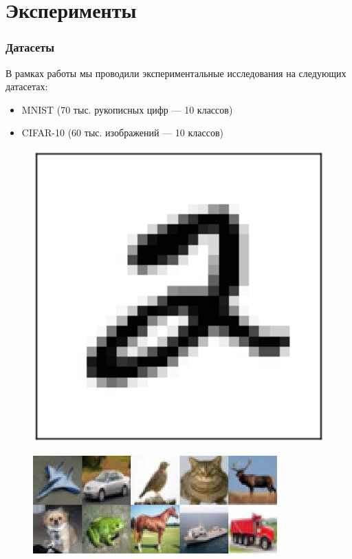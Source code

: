 \documentclass{beamer}
\begin{document}
\section{Эксперименты}

\begin{frame} 
\frametitle{Датасеты}	
В рамках работы мы проводили экспериментальные исследования на следующих датасетах:
\begin{itemize}
\item MNIST (70 тыс. рукописных цифр --- 10 классов)
\item CIFAR-10 (60 тыс. изображений --- 10 классов)
\end{itemize}	

\begin{minipage}{0.45\linewidth}
\begin{figure}
\includegraphics[scale=0.3]{mnist_img.png}
\end{figure}
\end{minipage} \hfill
\begin{minipage}{0.45\linewidth}
\begin{figure}
\includegraphics[scale=0.4]{cifar_img.jpeg}
\end{figure}
\end{minipage}

\end{frame}
\end{document}
